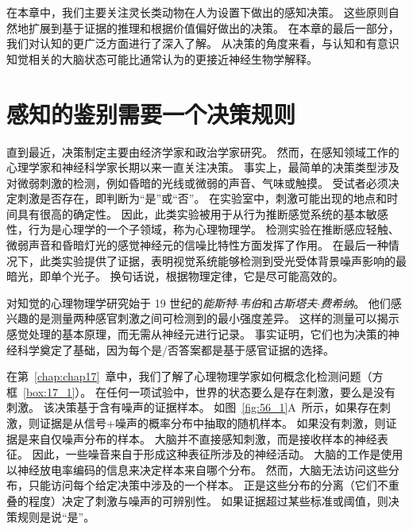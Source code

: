 在本章中，我们主要关注灵长类动物在人为设置下做出的感知决策。
这些原则自然地扩展到基于证据的推理和根据价值偏好做出的决策。
在本章的最后一部分，我们对认知的更广泛方面进行了深入了解。
从决策的角度来看，与认知和有意识知觉相关的大脑状态可能比通常认为的更接近神经生物学解释。



\section{感知的鉴别需要一个决策规则}

直到最近，决策制定主要由经济学家和政治学家研究。
然而，在感知领域工作的心理学家和神经科学家长期以来一直关注决策。
事实上，最简单的决策类型涉及对微弱刺激的检测，例如昏暗的光线或微弱的声音、气味或触摸。
受试者必须决定刺激是否存在，即判断为“是”或“否”。
在实验室中，刺激可能出现的地点和时间具有很高的确定性。
因此，此类实验被用于从行为推断感觉系统的基本敏感性，行为是心理学的一个子领域，称为心理物理学。
检测实验在推断感应轻触、微弱声音和昏暗灯光的感觉神经元的信噪比特性方面发挥了作用。
在最后一种情况下，此类实验提供了证据，表明视觉系统能够检测到受光受体背景噪声影响的最暗光，即单个光子。
换句话说，根据物理定律，它是尽可能高效的。


对知觉的心理物理学研究始于 19 世纪的\textit{能斯特$\cdot$韦伯}和\textit{古斯塔夫$\cdot$费希纳}。
他们感兴趣的是测量两种感官刺激之间可检测到的最小强度差异。
这样的测量可以揭示感觉处理的基本原理，而无需从神经元进行记录。
事实证明，它们也为决策的神经科学奠定了基础，因为每个是/否答案都是基于感官证据的选择。


在第~\ref{chap:chap17}~章中，我们了解了心理物理学家如何概念化检测问题（方框~\ref{box:17_1}）。
在任何一项试验中，世界的状态要么是存在刺激，要么是没有刺激。
该决策基于含有噪声的证据样本。
如图~\ref{fig:56_1}A~所示，如果存在刺激，则证据是从信号+噪声的概率分布中抽取的随机样本。
如果没有刺激，则证据是来自仅噪声分布的样本。
大脑并不直接感知刺激，而是接收样本的神经表征。
因此，一些噪音来自于形成这种表征所涉及的神经活动。
大脑的工作是使用以神经放电率编码的信息来决定样本来自哪个分布。
然而，大脑无法访问这些分布，只能访问每个给定决策中涉及的一个样本。
正是这些分布的分离（它们不重叠的程度）决定了刺激与噪声的可辨别性。
如果证据超过某些标准或阈值，则决策规则是说“是”。


